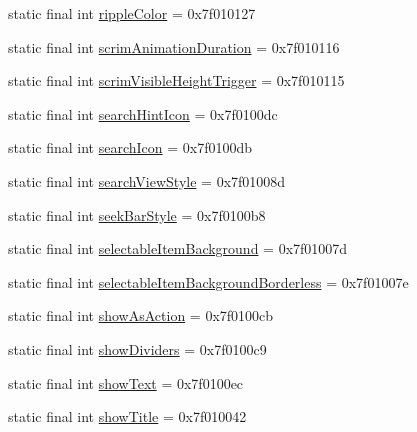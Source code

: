 \begin{CompactItemize}
\item 
static final int \hyperlink{classandroid_1_1support_1_1v7_1_1appcompat_1_1_r_1_1attr_b3060f739ffcc4cc769dd6b7f08a4582}{rippleColor} = 0x7f010127
\item 
static final int \hyperlink{classandroid_1_1support_1_1v7_1_1appcompat_1_1_r_1_1attr_276a9e1454534082f94d1e432cde455f}{scrimAnimationDuration} = 0x7f010116
\item 
static final int \hyperlink{classandroid_1_1support_1_1v7_1_1appcompat_1_1_r_1_1attr_3eb9880d05f7b4c0d35f0637c3293fc8}{scrimVisibleHeightTrigger} = 0x7f010115
\item 
static final int \hyperlink{classandroid_1_1support_1_1v7_1_1appcompat_1_1_r_1_1attr_c3afbcca419c2a43e3782be584c2515d}{searchHintIcon} = 0x7f0100dc
\item 
static final int \hyperlink{classandroid_1_1support_1_1v7_1_1appcompat_1_1_r_1_1attr_3e68a57acbf99b341f0b00b2aef9235b}{searchIcon} = 0x7f0100db
\item 
static final int \hyperlink{classandroid_1_1support_1_1v7_1_1appcompat_1_1_r_1_1attr_5977d2d4588d5ad06c319125fb65a3fb}{searchViewStyle} = 0x7f01008d
\item 
static final int \hyperlink{classandroid_1_1support_1_1v7_1_1appcompat_1_1_r_1_1attr_d5d9e62031ea31eea1fef2032ceea5af}{seekBarStyle} = 0x7f0100b8
\item 
static final int \hyperlink{classandroid_1_1support_1_1v7_1_1appcompat_1_1_r_1_1attr_4c4fe078915414a184c54a14daeff9b3}{selectableItemBackground} = 0x7f01007d
\item 
static final int \hyperlink{classandroid_1_1support_1_1v7_1_1appcompat_1_1_r_1_1attr_7f6aabc14f296518af71695b9eaf1d9f}{selectableItemBackgroundBorderless} = 0x7f01007e
\item 
static final int \hyperlink{classandroid_1_1support_1_1v7_1_1appcompat_1_1_r_1_1attr_b594cc2886740d8047bc817f3ca6425c}{showAsAction} = 0x7f0100cb
\item 
static final int \hyperlink{classandroid_1_1support_1_1v7_1_1appcompat_1_1_r_1_1attr_07982cb418d5bcf47bb5691b0e6f2a45}{showDividers} = 0x7f0100c9
\item 
static final int \hyperlink{classandroid_1_1support_1_1v7_1_1appcompat_1_1_r_1_1attr_654187859fe9075abf56d57a4c19b996}{showText} = 0x7f0100ec
\item 
static final int \hyperlink{classandroid_1_1support_1_1v7_1_1appcompat_1_1_r_1_1attr_aaced62e0592c6706f744dc93298942d}{showTitle} = 0x7f010042
\item 

\end{CompactItemize}
